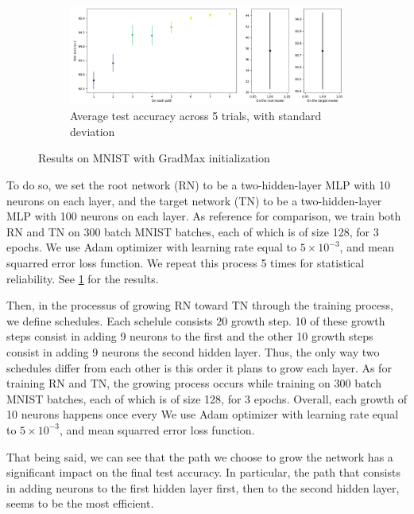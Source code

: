 \documentclass{article}
\begin{document}
\begin{figure}[htbp]
    \vspace{0.5cm}
    
    \begin{subfigure}[b]{0.5\textwidth}
        \centering
        \includegraphics[width=\textwidth]{imgs/statistical_reliability_MNIST_gradmax_2024_05_02_15_03_12.png}
        \caption{Average test accuracy across 5 trials, with standard deviation}
        \label{fig:MNIST_gradmax_statistical_reliability}
    \end{subfigure}
    \caption{Results on MNIST with GradMax initialization}
    \label{fig:subfigures}
\end{figure}

To do so, we set the root network (RN) to be a two-hidden-layer MLP with 10 neurons on each layer, and the target network (TN) to be a two-hidden-layer MLP with 100 neurons on each layer. As reference for comparison, we train both RN and TN on 300 batch MNIST batches, each of which is of size 128, for 3 epochs. We use Adam optimizer with learning rate equal to $5\times10^{-3}$, and mean squarred error loss function. We repeat this process 5 times for statistical reliability. See \ref{fig:MNIST_gradmax_statistical_reliability} for the results.

Then, in the processus of growing RN toward TN through the training process, we define schedules. Each schelule consists 20 growth step. 10 of these growth steps consist in adding 9 neurons to the first and the other 10 growth steps consist in adding 9 neurons the second hidden layer. Thus, the only way two schedules differ from each other is this order it plans to grow each layer. As for training RN and TN, the growing process occurs while training on 300 batch MNIST batches, each of which is of size 128, for 3 epochs. Overall, each growth of 10 neurons happens once every We use Adam optimizer with learning rate equal to $5\times10^{-3}$, and mean squarred error loss function.

That being said, we can see that the path we choose to grow the network has a significant impact on the final test accuracy. In particular, the path that consists in adding neurons to the first hidden layer first, then to the second hidden layer, seems to be the most efficient. 
\end{document}
